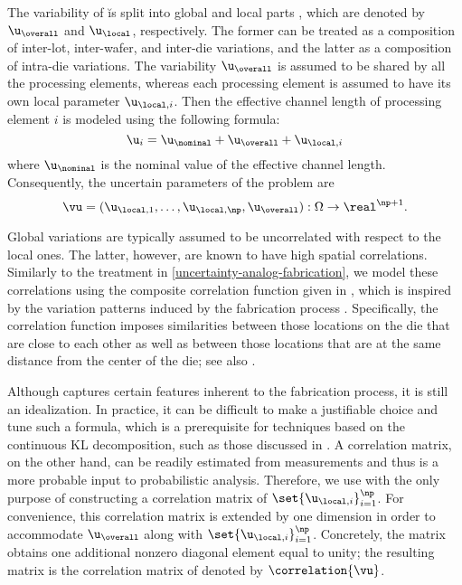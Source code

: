 The variability of \u is split into global and local parts \cite{shen2009,
chandra2010, juan2012}, which are denoted by $\u_\overall$ and $\u_\local$,
respectively. The former can be treated as a composition of inter-lot,
inter-wafer, and inter-die variations, and the latter as a composition of
intra-die variations. The variability $\u_\overall$ is assumed to be shared by
all the \np processing elements, whereas each processing element is assumed to
have its own local parameter $\u_{\local, i}$. Then the effective channel length
of processing element $i$ is modeled using the following formula:
\[
  \u_i = \u_\nominal + \u_\overall + \u_{\local, i}
\]
where $\u_\nominal$ is the nominal value of the effective channel length.
Consequently, the uncertain parameters of the problem are
\[
  \vu = (\u_{\local, 1}, \dotsc, \u_{\local, \np}, \u_\overall): \Omega \to \real^{\np + 1}.
\]

Global variations are typically assumed to be uncorrelated with respect to the
local ones. The latter, however, are known to have high spatial correlations.
Similarly to the treatment in \cref{uncertainty-analog-fabrication}, we model
these correlations using the composite correlation function given in
, which is inspired by the variation patterns induced by
the fabrication process \cite{friedberg2005, chandrakasan2000, cheng2011}.
Specifically, the correlation function imposes similarities between those
locations on the die that are close to each other as well as between those
locations that are at the same distance from the center of the die; see also
\cite{ghanem1991, ghanta2006, bhardwaj2008, huang2009a, lee2013}.

Although  captures certain features inherent to the
fabrication process, it is still an idealization. In practice, it can be
difficult to make a justifiable choice and tune such a formula, which is a
prerequisite for techniques based on the continuous \ac{KL} decomposition, such
as those discussed in . A correlation matrix, on the other
hand, can be readily estimated from measurements and thus is a more probable
input to probabilistic analysis. Therefore, we use  with
the only purpose of constructing a correlation matrix of $\set{\u_{\local,
i}}_{i = 1}^\np$. For convenience, this correlation matrix is extended by one
dimension in order to accommodate $\u_\overall$ along with $\set{\u_{\local,
i}}_{i = 1}^\np$. Concretely, the matrix obtains one additional nonzero diagonal
element equal to unity; the resulting matrix is the correlation matrix of \vu
denoted by $\correlation{\vu}$.

